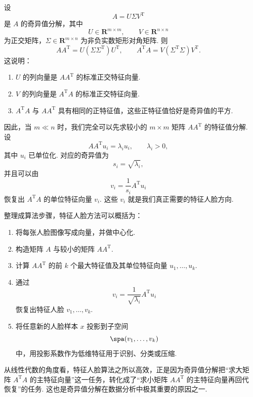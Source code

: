 设
\[
    A = U\Sigma V^{\mathrm{T}}
\]
是 $ A $ 的奇异值分解，其中
\[
    U \in \mathbf{R}^{m \times m},\qquad V \in \mathbf{R}^{n \times n}
\]
为正交矩阵，$ \Sigma \in \mathbf{R}^{m \times n} $ 为非负实数矩形对角矩阵. 则
\[
    AA^{\mathrm{T}} = U(\Sigma \Sigma^{\mathrm{T}})U^{\mathrm{T}},\qquad
    A^{\mathrm{T}}A = V(\Sigma^{\mathrm{T}}\Sigma)V^{\mathrm{T}}.
\]
这说明：
\begin{enumerate}
    \item $ U $ 的列向量是 $ AA^{\mathrm{T}} $ 的标准正交特征向量.

    \item $ V $ 的列向量是 $ A^{\mathrm{T}}A $ 的标准正交特征向量.

    \item $ A^{\mathrm{T}}A $ 与 $ AA^{\mathrm{T}} $ 具有相同的正特征值，这些正特征值恰好是奇异值的平方.
\end{enumerate}

因此，当 $ m \ll n $ 时，我们完全可以先求较小的 $ m \times m $ 矩阵 $ AA^{\mathrm{T}} $ 的特征值分解. 设
\[
    AA^{\mathrm{T}}u_i = \lambda_i u_i,\qquad \lambda_i > 0,
\]
其中 $ u_i $ 已单位化. 对应的奇异值为
\[
    s_i = \sqrt{\lambda_i},
\]
并且可以由
\[
    v_i = \frac{1}{s_i}A^{\mathrm{T}}u_i
\]
恢复出 $ A^{\mathrm{T}}A $ 的单位特征向量 $ v_i $. 这些 $ v_i $ 就是我们真正需要的特征人脸方向.

整理成算法步骤，特征人脸方法可以概括为：
\begin{enumerate}
    \item 将每张人脸图像写成向量，并做中心化.

    \item 构造矩阵 $ A $ 与较小的矩阵 $ AA^{\mathrm{T}} $.

    \item 计算 $ AA^{\mathrm{T}} $ 的前 $ k $ 个最大特征值及其单位特征向量 $ u_1, \ldots, u_k $.

    \item 通过
          \[
              v_i = \frac{1}{\sqrt{\lambda_i}}A^{\mathrm{T}}u_i
          \]
          恢复出特征人脸 $ v_1, \ldots, v_k $.

    \item 将任意新的人脸样本 $ x $ 投影到子空间
          \[
              \spa(v_1, \ldots, v_k)
          \]
          中，用投影系数作为低维特征用于识别、分类或压缩.
\end{enumerate}

从线性代数的角度看，特征人脸算法之所以高效，正是因为奇异值分解把“求大矩阵 $ A^{\mathrm{T}}A $ 的主特征向量”这一任务，转化成了“求小矩阵 $ AA^{\mathrm{T}} $ 的主特征向量再回代恢复”的任务. 这也是奇异值分解在数据分析中极其重要的原因之一.

